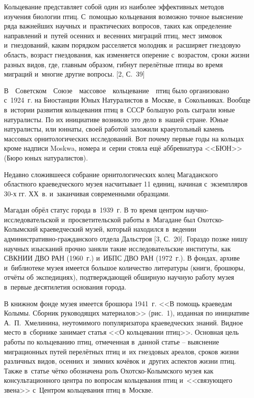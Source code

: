  

\makeProcTitle
{}

Кольцевание представляет собой один из наиболее эффективных методов изучения биологии птиц. С~помощью кольцевания возможно точное выяснение ряда важнейших научных и~практических вопросов, таких как определение направлений и~путей осенних и~весенних миграций птиц, мест зимовок и~гнездований, каким порядком расселяется молодняк и~расширяет гнездовую область, возраст гнездования, как изменяется оперение с~возрастом, сроки жизни разных видов, где, главным образом, гибнут перелётные птицы во время миграций и~многие другие вопросы. [2, С.~39]

В\ \ Советском\ \ Союзе\ \ массовое\ \ кольцевание\ \ птиц было организовано с~1924~г. на Биостанции Юных Натуралистов в~Москве, в~Сокольниках. Вообще в~истории развития кольцевания птиц в~СССР большую роль сыграли юные натуралисты. По их инициативе возникло это дело в~нашей стране. Юные натуралисты, или юннаты, своей работой заложили краеугольный камень массовых орнитологических исследований. Вот почему первые годы на кольцах кроме надписи Moskwa, номера и~серии стояла ещё аббревиатура <<БЮН>> (Бюро юных натуралистов).



Недавно сложившееся собрание орнитологических колец Магаданского областного краеведческого музея насчитывает 11 единиц, начиная с~экземпляров 30-х гг. ХХ~в. и~заканчивая современными образцами.

Магадан обрёл статус города в~1939~г. В то время центром научно-исследовательской и~просветительской работы в~Магадане был Охотско-Колымский краеведческий музей, который находился в~ведении ад\-ми\-нист\-ра\-тив\-но-гражданского отдела Дальстроя [3, С.~20]. Гораздо позже нишу научных изысканий прочно заняли такие исследовательские институты, как СВКНИИ ДВО РАН (1960~г.) и~ИБПС ДВО РАН (1972~г.). В фондах, архиве и~библиотеке музея имеется большое количество литературы (книги, брошюры, отчёты об экспедициях), подтверждающей обширную научную работу музея в~первые десятилетия основания города.

В книжном фонде музея имеется брошюра 1941~г. <<В помощь краеведам Колымы. Сборник руководящих материалов>> (рис.~1), изданная по инициативе А.~П.~Хмелинина, неутомимого популяризатора краеведческих знаний. Видное место в~сборнике занимает статья <<О кольцевании птиц>>. Основная цель работы по кольцеванию птиц, отмеченная в~данной статье – выяснение миграционных путей перелётных птиц и~их гнездовых ареалов, сроков жизни различных видов, осенних и~зимних кочёвок и~других аспектов жизни птиц. Также в~статье чётко обозначена роль Охотско-Колымского музея как консультационного центра по вопросам кольцевания птиц и~<<связующего звена>> с~Центром кольцевания птиц в~Москве.

